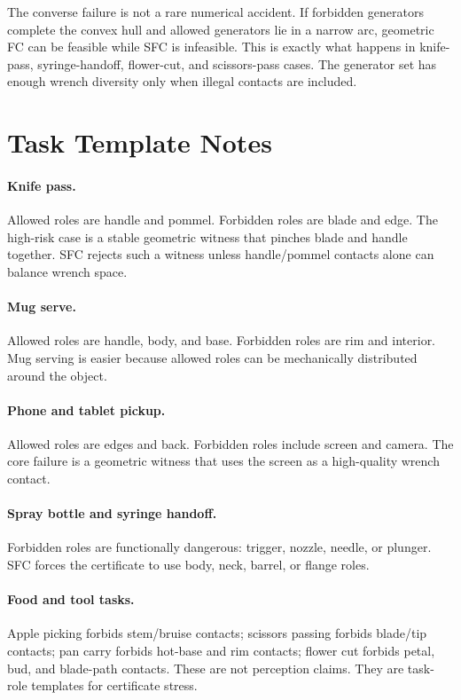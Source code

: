 \documentclass{article}
\begin{document}
The converse failure is not a rare numerical accident. If forbidden generators complete the convex hull and allowed generators lie in a narrow arc, geometric FC can be feasible while SFC is infeasible. This is exactly what happens in knife-pass, syringe-handoff, flower-cut, and scissors-pass cases. The generator set has enough wrench diversity only when illegal contacts are included.

\section{Task Template Notes}

\paragraph{Knife pass.}
Allowed roles are handle and pommel. Forbidden roles are blade and edge. The high-risk case is a stable geometric witness that pinches blade and handle together. SFC rejects such a witness unless handle/pommel contacts alone can balance wrench space.

\paragraph{Mug serve.}
Allowed roles are handle, body, and base. Forbidden roles are rim and interior. Mug serving is easier because allowed roles can be mechanically distributed around the object.

\paragraph{Phone and tablet pickup.}
Allowed roles are edges and back. Forbidden roles include screen and camera. The core failure is a geometric witness that uses the screen as a high-quality wrench contact.

\paragraph{Spray bottle and syringe handoff.}
Forbidden roles are functionally dangerous: trigger, nozzle, needle, or plunger. SFC forces the certificate to use body, neck, barrel, or flange roles.

\paragraph{Food and tool tasks.}
Apple picking forbids stem/bruise contacts; scissors passing forbids blade/tip contacts; pan carry forbids hot-base and rim contacts; flower cut forbids petal, bud, and blade-path contacts. These are not perception claims. They are task-role templates for certificate stress.
\end{document}
